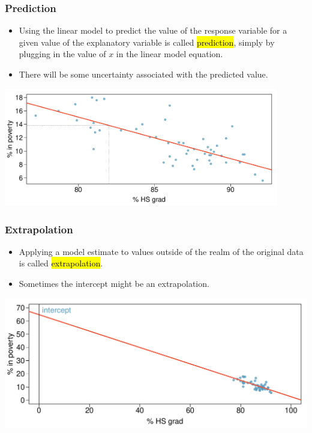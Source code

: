 \begin{frame}
\frametitle{Prediction}

\begin{itemize}

\item Using the linear model to predict the value of the response variable for a given value of the explanatory variable is called \hl{prediction}, simply by plugging in the value of $x$ in the linear model equation.

\item There will be some uncertainty associated with the predicted value.

\end{itemize}

\begin{center}
\includegraphics[width=0.9\textwidth]{8-2_least_square_reg/figures/poverty/poverty_hsgrad_pred}
\end{center}

\end{frame}


\begin{frame}
\frametitle{Extrapolation}

\begin{itemize}

\item Applying a model estimate to values outside of the realm of the original data is called \hl{extrapolation}.

\item Sometimes the intercept might be an extrapolation.

\end{itemize}

\begin{center}
\includegraphics[width=\textwidth]{8-2_least_square_reg/figures/poverty/poverty_hsgrad_line_wide}
\end{center}

\end{frame}


